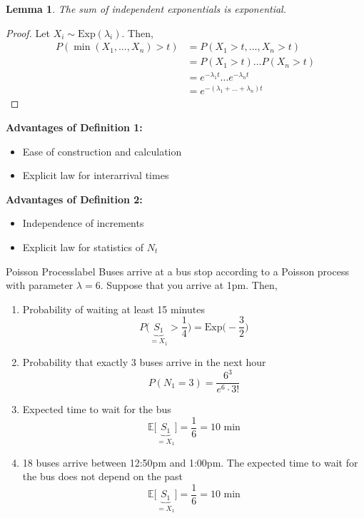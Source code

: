 \documentclass{tufte-handout}
\newtheorem{lem}[thm]{Lemma}
\begin{document}
\begin{lem}
  The sum of independent exponentials is exponential.
\end{lem}

\begin{proof}
  Let $X_i \sim \text{Exp}(\lambda_i)$. Then,
  \begin{align*}
  P\left(\min \left(X_{1}, \ldots, X_{n}\right)>t\right)
  &=P\left(X_{1}>t, \ldots, X_{n}>t\right) \\
  &=P\left(X_{1}>t\right) \ldots P\left(X_{n}>t\right) \\
  &=e^{-\lambda_{1} t} \ldots e^{-\lambda_{n} t} \\
  &=e^{-\left(\lambda_{1}+\ldots+\lambda_{n}\right) t}
  \end{align*}
\end{proof}

\begin{marginfigure}
  \textbf{Advantages of Definition 1:}
  \begin{itemize}
    \item Ease of construction and calculation
    \item Explicit law for interarrival times
  \end{itemize}

  \noindent \textbf{Advantages of Definition 2:}
    \begin{itemize}
    \item Independence of increments
    \item Explicit law for statistics of $N_t$
  \end{itemize}
\end{marginfigure}

\begin{ex}{Poisson Process}{label}
  Buses arrive at a bus stop according to a Poisson process with parameter $\lambda = 6$. Suppose that you arrive at 1pm. Then,
  \begin{enumerate}
    \item Probability of waiting at least 15 minutes
    \[P\bigg(\underbrace{S_1}_{= X_1} > \frac{1}{4}\bigg) = \text{Exp}\bigg(-\frac{3}{2}\bigg)\]
    \item Probability that exactly 3 buses arrive in the next hour
    \[P(N_1 = 3) = \frac{6^3}{e^6 \cdot 3!}\]
    \item Expected time to wait for the bus
    \[\mathbb{E}\bigg[\underbrace{S_1}_{= X_1}\bigg] = \frac{1}{6} = 10 \text{ min}\]
    \item 18 buses arrive between 12:50pm and 1:00pm. The expected time to wait for the bus does not depend on the past
    \[\mathbb{E}\bigg[\underbrace{S_1}_{= X_1}\bigg] = \frac{1}{6} = 10 \text{ min}\]
  \end{enumerate}
\end{ex}
\end{document}
